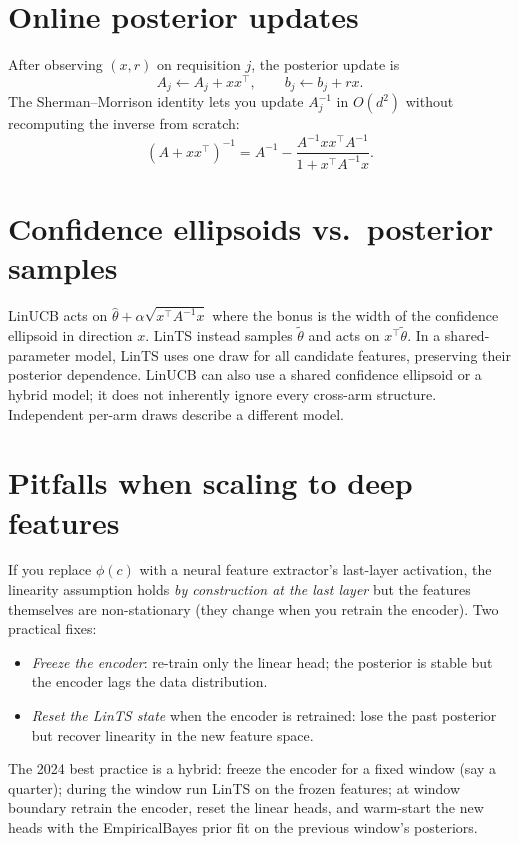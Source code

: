 \documentclass[11pt,oneside]{scrbook}
\begin{document}
\section{Online posterior updates}

After observing $(x, r)$ on requisition $j$, the posterior update is
\[
A_j \leftarrow A_j + x x^\top, \qquad b_j \leftarrow b_j + r x.
\]
The Sherman--Morrison identity lets you update $A_j^{-1}$ in $O(d^2)$
without recomputing the inverse from scratch:
\[
(A + x x^\top)^{-1} = A^{-1} - \frac{A^{-1} x x^\top A^{-1}}{1 + x^\top A^{-1} x}.
\]

\section{Confidence ellipsoids vs.\ posterior samples}

LinUCB acts on $\hat\theta + \alpha\sqrt{x^\top A^{-1} x}$ where the bonus
is the width of the confidence ellipsoid in direction $x$. LinTS instead
samples $\tilde\theta$ and acts on $x^\top \tilde\theta$. In a shared-parameter model, LinTS uses one draw for all candidate
features, preserving their posterior dependence. LinUCB can also use a shared
confidence ellipsoid or a hybrid model; it does not inherently ignore every
cross-arm structure. Independent per-arm draws describe a different model.


\section{Pitfalls when scaling to deep features}

If you replace $\phi(c)$ with a neural feature extractor's last-layer
activation, the linearity assumption holds \emph{by construction at the
last layer} but the features themselves are non-stationary (they change
when you retrain the encoder). Two practical fixes:
\begin{itemize}\setlength\itemsep{1pt}
  \item \emph{Freeze the encoder}: re-train only the linear head; the
        posterior is stable but the encoder lags the data distribution.
  \item \emph{Reset the LinTS state} when the encoder is retrained: lose
        the past posterior but recover linearity in the new feature space.
\end{itemize}

The 2024 best practice is a hybrid: freeze the encoder for a fixed window
(say a quarter); during the window run LinTS on the frozen features; at
window boundary retrain the encoder, reset the linear heads, and warm-start
the new heads with the EmpiricalBayes prior fit on the previous window's
posteriors.
\end{document}

